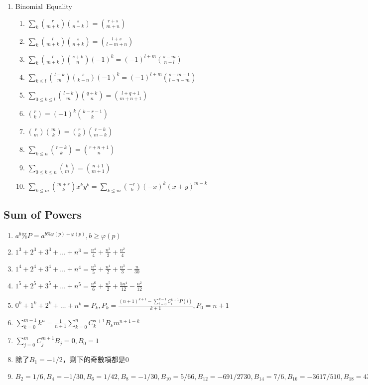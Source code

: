\begin{enumerate}
\item Binomial\ Equality
	\begin{enumerate}\itemsep = -2pt
	    \item $\sum_k \binom{r}{m + k} \binom{s}{n - k} = \binom{r + s}{m + n}$
         \item $\sum_k \binom{l}{m + k} \binom{s}{n + k} = \binom{l + s}{l -m + n}$		
         \item $\sum_k \binom{l}{m + k} \binom{s + k}{n}(-1)^k = (-1)^{l + m} \binom{s - m}{n - l}$
		\item $\sum_{k\leq l} \binom{l - k}{m} \binom{s}{k - n}(-1)^k = (-1)^{l + m} \binom{s - m - 1}{l - n - m}$
		\item $\sum_{0 \leq k \leq l} \binom{l - k}{m} \binom{q + k}{n} = \binom{l + q + 1}{m + n + 1}$
		\item $\binom{r}{k} = (-1)^k\binom{k - r - 1}{k}$
		\item $\binom{r}{m} \binom{m}{k} = \binom{r}{k} \binom{r - k}{m - k}$
		\item $\sum_{k\leq n} \binom{r + k}{k} = \binom{r + n + 1}{n}$
		\item $\sum_{0\leq k \leq n} \binom{k}{m} = \binom{n + 1}{m + 1}$
		\item $\sum_{k\leq m}\binom{m + r}{k}x^ky^k = \sum_{k\leq m}\binom{-r}{k}(-x)^k (x+y)^{m-k}$	
	\end{enumerate}
\end{enumerate}


\subsection{Sum of Powers}
\begin{enumerate}\itemsep = -3pt
	\item $a^b\%P=a^{b\% \varphi (p)+\varphi (p)},b\geq \varphi (p)$
	\item $1^3+2^3+3^3+\ldots +n^3=\frac{n^4}{4}+\frac{n^3}{2}+\frac{n^2}{4}$
	\item $1^4+2^4+3^4+\ldots +n^4=\frac{n^5}{5}+\frac{n^4}{2}+\frac{n^3}{3}-\frac{n}{30}$
	\item $1^5+2^5+3^5+\ldots +n^5=\frac{n^6}{6}+\frac{n^5}{2}+\frac{5n^4}{12}-\frac{n^2}{12}$
	\item $0^k+1^k+2^k+\ldots +n^k = P_k,P_k=\frac{(n+1)^{k+1}-\sum_{i=0}^{k-1}C_i^{k+1}P(i)}{k+1},P_0=n+1$
	\item $\sum_{k=0}^{m-1}k^n=\frac{1}{n+1}\sum_{k=0}^{n}C_k^{n+1}B_km^{n+1-k}$
	\item $\sum_{j=0}^{m}C_j^{m+1}B_j=0,B_0=1$
	\item 除了$B_1=-1/2$，剩下的奇數項都是$0$
	\item $B_2=1/6,B_4=-1/30,B_6=1/42,B_8=-1/30,B_{10}=5/66,B_{12}=-691/2730,B_{14}=7/6,B_{16}=-3617/510,B_{18}=43867/798,B_{20}=-174611/330,$
\end{enumerate}

